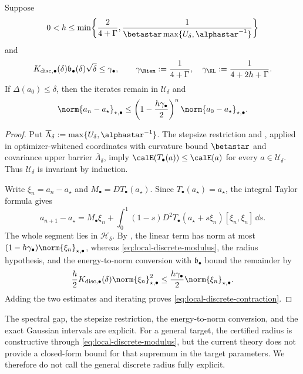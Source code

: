\begin{theorem}
\label{thm:local-discrete-contraction}
Suppose
\[
  0<h\leq
  \min\!\left\{
    \frac{2}{4+\Gamma},
    \frac{1}{\betastar\max\{U_\delta,\alphastar^{-1}\}}
  \right\}
\]
and
\[
  K_{\mathrm{disc},\bullet}(\delta)
  \mathfrak b_\bullet(\delta)\sqrt\delta
  \leq\gamma_\bullet,
  \qquad
  \gamma_{\Riem}:=\frac1{4+\Gamma},\quad
  \gamma_{\KL}:=\frac1{4+2h+\Gamma}.
\]
If \(\Delta(a_0)\leq\delta\), then the iterates remain in
\(\mathcal U_\delta\) and
\begin{equation}
  \norm{a_n-a_\star}_{\star,\bullet}
  \leq
  \left(1-\frac{h\gamma_\bullet}{2}\right)^n
  \norm{a_0-a_\star}_{\star,\bullet}.
  \label{eq:local-discrete-contraction}
\end{equation}
\end{theorem}

\begin{proof}
Put
\(\overline\Lambda_\delta
:=\max\{U_\delta,\alphastar^{-1}\}\).
The stepsize restriction and
, applied in optimizer-whitened
coordinates with curvature bound \(\betastar\) and covariance upper barrier
\(\overline\Lambda_\delta\), imply
\(\calE(T_\bullet(a))\leq\calE(a)\) for every
\(a\in\mathcal U_\delta\).  Thus \(\mathcal U_\delta\) is invariant by
induction.

Write \(\xi_n=a_n-a_\star\) and
\(M_\bullet=DT_\bullet(a_\star)\).  Since
\(T_\bullet(a_\star)=a_\star\), the integral Taylor formula gives
\[
  a_{n+1}-a_\star
  =M_\bullet\xi_n
   +\int_0^1(1-s)
      D^2T_\bullet(a_\star+s\xi_n)[\xi_n,\xi_n]\,\dd s.
\]
The whole segment lies in \(\mathcal H_\delta\).  By
, the linear term has norm at most
\((1-h\gamma_\bullet)\norm{\xi_n}_{\star,\bullet}\), whereas
\eqref{eq:local-discrete-modulus}, the radius hypothesis, and the
energy-to-norm conversion with \(\mathfrak b_\bullet\) bound the remainder by
\[
  \frac h2K_{\mathrm{disc},\bullet}(\delta)
  \norm{\xi_n}_{\star,\bullet}^2
  \leq
  \frac{h\gamma_\bullet}{2}
  \norm{\xi_n}_{\star,\bullet}.
\]
Adding the two estimates and iterating proves
\eqref{eq:local-discrete-contraction}.
\end{proof}

\begin{remark}
\label{rem:local-discrete-explicitness}
The spectral gap, the stepsize restriction, the energy-to-norm conversion,
and the exact Gaussian intervals are explicit.  For a general target, the
certified radius is constructive through
\eqref{eq:local-discrete-modulus}, but the current theory does not provide a
closed-form bound for that supremum in the target parameters.  We therefore
do not call the general discrete radius fully explicit.
\end{remark}

